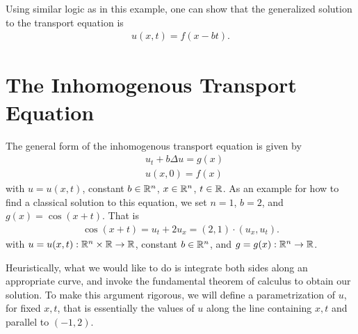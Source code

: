 Using similar logic as in this example, one can show that the generalized
solution to the transport equation is
\begin{equation*}
\begin{split}
	u(x,t) = f(x-bt).
\end{split}
\end{equation*}
\section{The Inhomogenous Transport Equation}

The general form of the inhomogenous transport equation is given by
\begin{equation*}
\begin{split}
	& u_{t}  + b\Delta u = g(x)
	\\
	& u(x,0) = f(x)
\end{split}
\end{equation*}
with $u = u(x,t)$, constant $b \in \mathbb{R}^n$, $x \in \mathbb{R}^{n}$, $t \in \mathbb{R}$.
As an example for how to find a classical solution to this equation, we set
$n = 1$, $b=2$, and $g(x) = \cos(x+t)$. That is
\begin{equation}
\begin{split}
	\cos(x + t) = u_{t} + 2 u _{x} = (2,1) \cdot (u_{x}, u_{t}).
\end{split}
\end{equation}
with $u = u(x,t): \mathbb{R}^{n} \times \mathbb{R} \to \mathbb{R}$, constant $b \in \mathbb{R}^n$, and
$g = g(x): \mathbb{R}^{n} \to \mathbb{R}$.

Heuristically, what we would like to do is integrate both sides along an
appropriate curve, and invoke the fundamental theorem of calculus to obtain our
solution. To make this argument rigorous, we will define a parametrization of
$u$, for fixed $x,t$, that is essentially the values of $u$ along the line
containing $x, t$ and parallel to $(-1,2)$.


